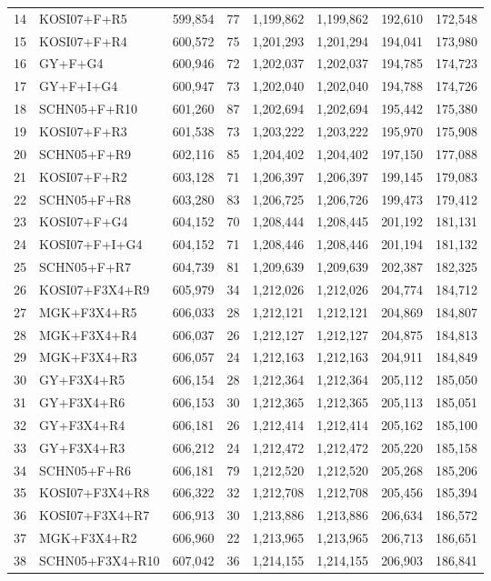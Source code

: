\begin{longtable}{rlrrrrrr}
14&KOSI07+F+R5&599,854&77&1,199,862&1,199,862&192,610&172,548\\
15&KOSI07+F+R4&600,572&75&1,201,293&1,201,294&194,041&173,980\\
16&GY+F+G4&600,946&72&1,202,037&1,202,037&194,785&174,723\\
17&GY+F+I+G4&600,947&73&1,202,040&1,202,040&194,788&174,726\\
18&SCHN05+F+R10&601,260&87&1,202,694&1,202,694&195,442&175,380\\
19&KOSI07+F+R3&601,538&73&1,203,222&1,203,222&195,970&175,908\\
20&SCHN05+F+R9&602,116&85&1,204,402&1,204,402&197,150&177,088\\
21&KOSI07+F+R2&603,128&71&1,206,397&1,206,397&199,145&179,083\\
22&SCHN05+F+R8&603,280&83&1,206,725&1,206,726&199,473&179,412\\
23&KOSI07+F+G4&604,152&70&1,208,444&1,208,445&201,192&181,131\\
24&KOSI07+F+I+G4&604,152&71&1,208,446&1,208,446&201,194&181,132\\
25&SCHN05+F+R7&604,739&81&1,209,639&1,209,639&202,387&182,325\\
26&KOSI07+F3X4+R9&605,979&34&1,212,026&1,212,026&204,774&184,712\\
27&MGK+F3X4+R5&606,033&28&1,212,121&1,212,121&204,869&184,807\\
28&MGK+F3X4+R4&606,037&26&1,212,127&1,212,127&204,875&184,813\\
29&MGK+F3X4+R3&606,057&24&1,212,163&1,212,163&204,911&184,849\\
30&GY+F3X4+R5&606,154&28&1,212,364&1,212,364&205,112&185,050\\
31&GY+F3X4+R6&606,153&30&1,212,365&1,212,365&205,113&185,051\\
32&GY+F3X4+R4&606,181&26&1,212,414&1,212,414&205,162&185,100\\
33&GY+F3X4+R3&606,212&24&1,212,472&1,212,472&205,220&185,158\\
34&SCHN05+F+R6&606,181&79&1,212,520&1,212,520&205,268&185,206\\
35&KOSI07+F3X4+R8&606,322&32&1,212,708&1,212,708&205,456&185,394\\
36&KOSI07+F3X4+R7&606,913&30&1,213,886&1,213,886&206,634&186,572\\
37&MGK+F3X4+R2&606,960&22&1,213,965&1,213,965&206,713&186,651\\
38&SCHN05+F3X4+R10&607,042&36&1,214,155&1,214,155&206,903&186,841\\

\end{longtable}
